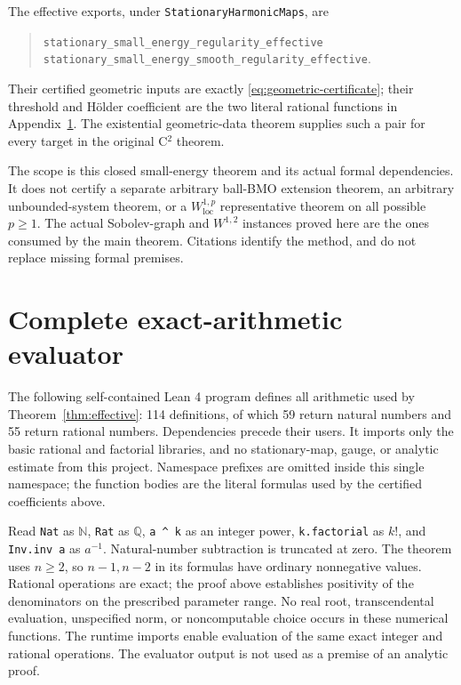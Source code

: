 \documentclass[11pt,a4paper]{article}
\numberwithin{equation}{section}
\theoremstyle{definition}
\theoremstyle{remark}
\newcommand{\loc}{\mathrm{loc}}
\newcommand{\lean}[1]{\nolinkurl{#1}}
\begin{document}
The effective exports, under \lean{StationaryHarmonicMaps}, are
\begin{quote}
\lean{stationary_small_energy_regularity_effective}\\
\lean{stationary_small_energy_smooth_regularity_effective}.
\end{quote} Their certified geometric inputs are
exactly \eqref{eq:geometric-certificate}; their threshold and H\"older
coefficient are the two literal rational functions in
Appendix~\ref{app:algorithm}. The existential geometric-data theorem
supplies such a pair for every target in the original C$^2$ theorem.

The scope is this closed small-energy theorem and its actual formal
dependencies. It does not certify a separate arbitrary ball-BMO
extension theorem, an arbitrary unbounded-system theorem, or a
$W^{1,p}_{\loc}$ representative theorem on all possible $p\geq1$.
The actual Sobolev-graph and $W^{1,2}$ instances proved here are the
ones consumed by the main theorem. Citations identify the method,
and do not replace missing formal premises.

\appendix
\section{Complete exact-arithmetic evaluator}\label{app:algorithm}
The following self-contained Lean 4 program defines all arithmetic used by
Theorem~\ref{thm:effective}: 114 definitions, of which 59 return natural
numbers and 55 return rational numbers. Dependencies precede their users.
It imports only the basic rational and factorial libraries, and no
stationary-map, gauge, or analytic estimate from this project. Namespace
prefixes are omitted inside this single namespace; the function bodies are
the literal formulas used by the certified coefficients above.

Read \lean{Nat} as $\mathbb N$, \lean{Rat} as $\mathbb Q$,
\lean{a ^ k} as an integer power, \lean{k.factorial} as $k!$,
and \lean{Inv.inv a} as $a^{-1}$. Natural-number subtraction is truncated
at zero. The theorem uses $n\geq2$, so $n-1,n-2$ in its formulas have
ordinary nonnegative values. Rational operations are exact; the proof above
establishes positivity of the denominators on the prescribed parameter
range. No real root, transcendental evaluation, unspecified norm,
or noncomputable choice occurs in these numerical functions.
The runtime imports enable evaluation of the same exact integer and rational
operations. The evaluator output is not used as a premise of an analytic
proof.
\end{document}
